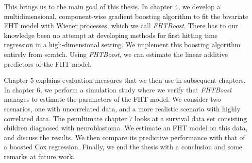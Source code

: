 This brings us to the main goal of this thesis.
In chapter 4, we develop a multidimensional, component-wise gradient boosting algorithm to fit the bivariate FHT model with Wiener processes, which we call \textit{FHTBoost}.
There has to our knowledge been no attempt at developing methods for first hitting time regression in a high-dimensional setting.
We implement this boosting algorithm entirely from scratch.
Using \textit{FHTBoost}, we can estimate the linear additive predictors of the FHT model.

Chapter 5 explains evaluation measures that we then use in subsequent chapters.
In chapter 6, we perform a simulation study where we verify that \textit{FHTBoost} manages to estimate the parameters of the FHT model.
We consider two scenarios, one with uncorrelated data, and a more realistic scenario with highly correlated data.
The penultimate chapter 7 looks at a survival data set consisting children diagnosed with neuroblastoma.
We estimate an FHT model on this data, and discuss the results.
We then compare its predictive performance with that of a boosted Cox regression.
Finally, we end the thesis with a conclusion and some remarks at future work.